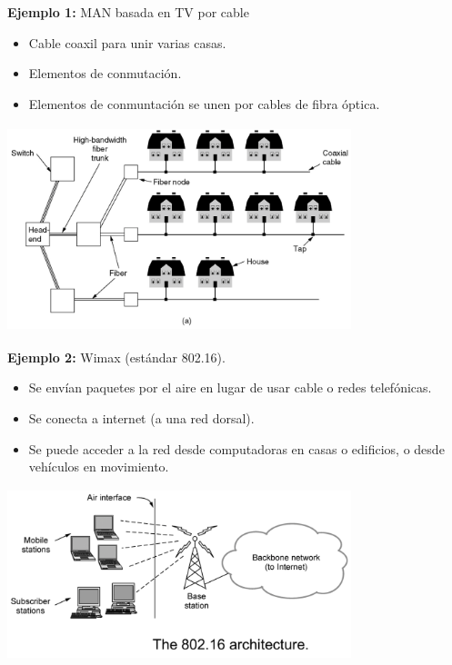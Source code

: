 \documentclass[10pt,a4paper]{report}
\begin{document}
\textbf{Ejemplo 1:} MAN basada en TV por cable
	\begin{itemize}
		\item Cable coaxil para unir varias casas.
		\item Elementos de conmutación.
		\item Elementos de conmuntación se unen por cables de fibra óptica.
	\end{itemize}
	
	\begin{center}
		\includegraphics[width=10cm, height=6cm]{./imagenes/metropolitana1.png} 
	\end{center}

\textbf{Ejemplo 2:} Wimax (estándar 802.16).
	\begin{itemize}
		\item Se envían paquetes por el aire en lugar de usar cable o redes telefónicas.
		\item Se conecta a internet (a una red dorsal).
		\item Se puede acceder a la red desde computadoras en casas o edificios, o 
		desde vehículos en movimiento.
	\end{itemize}	 
	
	\begin{center}
		\includegraphics[width=10cm, height=5cm]{./imagenes/metropolitana2.png} 
	\end{center}
\end{document}
